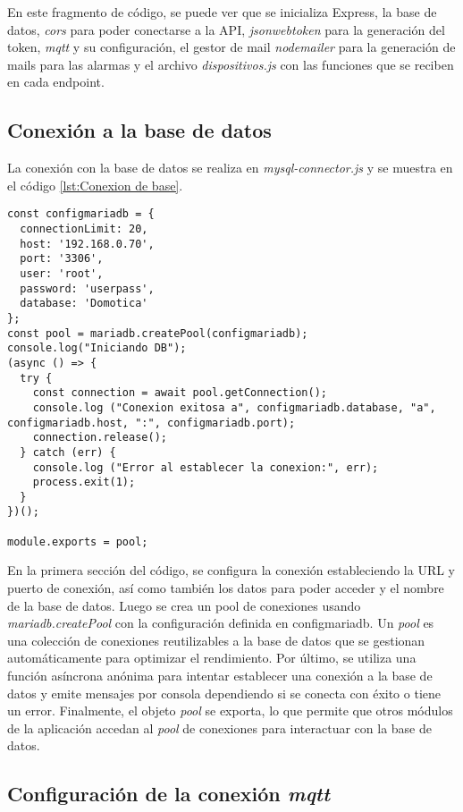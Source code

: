 En este fragmento de código, se puede ver que se inicializa Express, la base de datos, \textit{cors} para poder conectarse a la API, \textit{jsonwebtoken} para la generación del token, \textit{mqtt} y su configuración, el gestor de mail \textit{nodemailer} para la generación de mails para las alarmas y el archivo \textit{dispositivos.js} con las funciones que se reciben en cada endpoint.

\subsection{Conexión a la base de datos}

La conexión con la base de datos se realiza en \textit{mysql-connector.js} y se muestra en el código \ref{lst:Conexion de base}.

\begin{lstlisting}[caption={Conexión con la base de datos.}, label={lst:Conexion de base}]
const configmariadb = {
  connectionLimit: 20,
  host: '192.168.0.70',
  port: '3306',
  user: 'root',
  password: 'userpass',
  database: 'Domotica'
};
const pool = mariadb.createPool(configmariadb);
console.log("Iniciando DB");
(async () => {
  try {
    const connection = await pool.getConnection();
    console.log ("Conexion exitosa a", configmariadb.database, "a", configmariadb.host, ":", configmariadb.port);
    connection.release();
  } catch (err) {
    console.log ("Error al establecer la conexion:", err);
    process.exit(1);
  }
})();

module.exports = pool;
\end{lstlisting}

En la primera sección del código, se configura la conexión estableciendo la URL y puerto de conexión, así como también los datos para poder acceder y el nombre de la base de datos. Luego se crea un pool de conexiones usando \textit{mariadb.createPool} con la configuración definida en configmariadb. Un \textit{pool} es una colección de conexiones reutilizables a la base de datos que se gestionan automáticamente para optimizar el rendimiento. Por último, se utiliza una función asíncrona anónima para intentar establecer una conexión a la base de datos y emite mensajes por consola dependiendo si se conecta con éxito o tiene un error. Finalmente, el objeto \textit{pool} se exporta, lo que permite que otros módulos de la aplicación accedan al \textit{pool} de conexiones para interactuar con la base de datos.

\subsection{Configuración de la conexión \textit{mqtt}}

